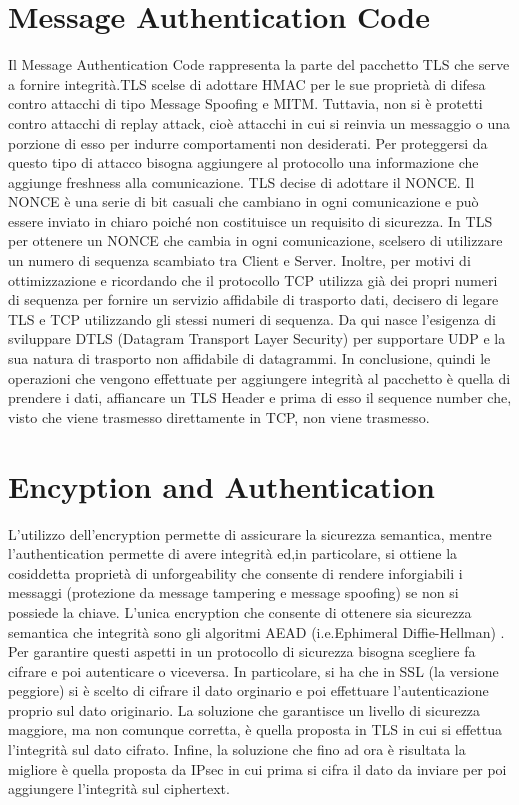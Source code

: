 \documentclass[a4paper,draft]{article}
\begin{document}
\section{Message Authentication Code}
Il Message Authentication Code rappresenta la parte del pacchetto TLS che serve a fornire integrità\@.TLS scelse di adottare HMAC per le sue proprietà di difesa contro attacchi di tipo Message Spoofing e MITM\@. Tuttavia, non si è protetti contro attacchi di replay attack, cioè attacchi in cui si reinvia un messaggio o una porzione di esso per indurre comportamenti non desiderati\@.
Per proteggersi da questo tipo di attacco bisogna aggiungere al protocollo una informazione che aggiunge freshness alla comunicazione\@. TLS decise di adottare il NONCE\@.
Il NONCE è una serie di bit casuali che cambiano in ogni comunicazione e può essere inviato in chiaro poiché non costituisce un requisito di sicurezza. In TLS per ottenere un NONCE che cambia in ogni comunicazione, scelsero di utilizzare un numero di sequenza scambiato tra Client e Server. Inoltre, per motivi di ottimizzazione e ricordando che il protocollo TCP utilizza già dei propri numeri di sequenza per fornire un servizio affidabile di trasporto dati, decisero di legare TLS e TCP utilizzando gli stessi numeri di sequenza\@.
Da qui nasce l'esigenza di sviluppare DTLS (Datagram Transport Layer Security) per supportare UDP e la sua natura di trasporto non affidabile di datagrammi\@.\newline
In conclusione, quindi le operazioni che vengono effettuate per aggiungere integrità al pacchetto è quella di prendere i dati, affiancare un TLS Header e prima di esso il sequence number che, visto che viene trasmesso direttamente in TCP, non viene trasmesso.
\section{Encyption and Authentication}
L'utilizzo dell'encryption permette di assicurare la sicurezza semantica, mentre l'authentication permette di avere integrità ed,in particolare, si ottiene la cosiddetta proprietà di unforgeability che consente di rendere inforgiabili i messaggi (protezione da message tampering e message spoofing) se non si possiede la chiave\@.
L'unica encryption che consente di ottenere sia sicurezza semantica che integrità sono gli algoritmi AEAD (i.e.Ephimeral Diffie-Hellman) \@.
Per garantire questi aspetti in un protocollo di sicurezza bisogna scegliere fa cifrare e poi autenticare o viceversa. In particolare, si ha che in SSL (la versione peggiore) si è scelto di cifrare il dato orginario e poi effettuare l'autenticazione proprio sul dato originario. La soluzione che garantisce un livello di sicurezza maggiore, ma non comunque corretta, è quella proposta in TLS in cui si effettua l'integrità sul dato cifrato\@. Infine, la soluzione che fino ad ora è risultata la migliore è quella proposta da IPsec in cui prima si cifra il dato da inviare per poi aggiungere l'integrità sul ciphertext.
\end{document}
